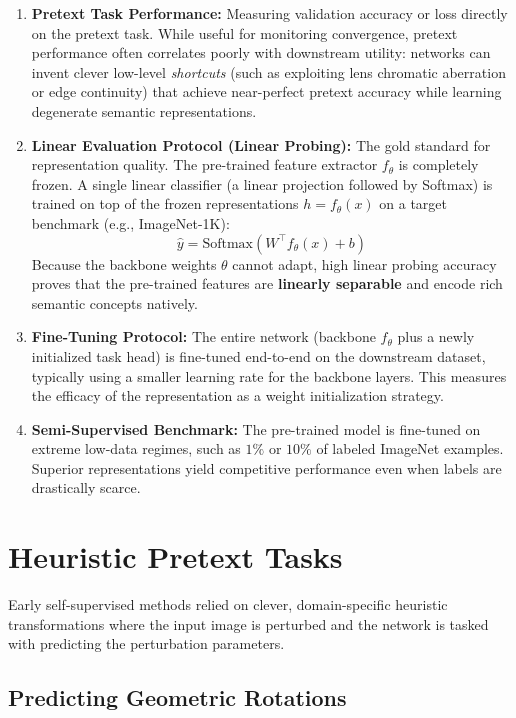 \begin{enumerate}[leftmargin=*]
    \item \textbf{Pretext Task Performance:} Measuring validation accuracy or loss directly on the pretext task. While useful for monitoring convergence, pretext performance often correlates poorly with downstream utility: networks can invent clever low-level \emph{shortcuts} (such as exploiting lens chromatic aberration or edge continuity) that achieve near-perfect pretext accuracy while learning degenerate semantic representations.
    \item \textbf{Linear Evaluation Protocol (Linear Probing):} The gold standard for representation quality. The pre-trained feature extractor $f_\theta$ is completely frozen. A single linear classifier (a linear projection followed by Softmax) is trained on top of the frozen representations $h = f_\theta(x)$ on a target benchmark (e.g., ImageNet-1K):
    \begin{equation}
        \hat{y} = \text{Softmax}(W^\top f_\theta(x) + b)
    \end{equation}
    Because the backbone weights $\theta$ cannot adapt, high linear probing accuracy proves that the pre-trained features are \textbf{linearly separable} and encode rich semantic concepts natively.
    \item \textbf{Fine-Tuning Protocol:} The entire network (backbone $f_\theta$ plus a newly initialized task head) is fine-tuned end-to-end on the downstream dataset, typically using a smaller learning rate for the backbone layers. This measures the efficacy of the representation as a weight initialization strategy.
    \item \textbf{Semi-Supervised Benchmark:} The pre-trained model is fine-tuned on extreme low-data regimes, such as $1\%$ or $10\%$ of labeled ImageNet examples. Superior representations yield competitive performance even when labels are drastically scarce.
\end{enumerate}



\section{Heuristic Pretext Tasks}

Early self-supervised methods relied on clever, domain-specific heuristic transformations where the input image is perturbed and the network is tasked with predicting the perturbation parameters.

\subsection{Predicting Geometric Rotations}

